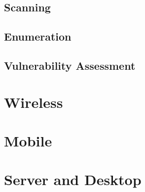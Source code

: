 \documentclass[7x9]{times}
\begin{document}
\section{Scanning}
\section{Enumeration}
\section{Vulnerability Assessment}

\chapter{Wireless}



\chapter{Mobile}

\chapter{Server and Desktop}

%




\end{document}
